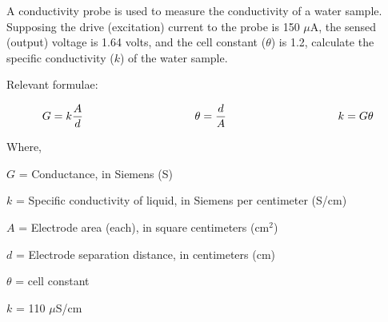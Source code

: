 

A conductivity probe is used to measure the conductivity of a water sample.  Supposing the drive (excitation) current to the probe is 150 $\mu$A, the sensed (output) voltage is 1.64 volts, and the cell constant ($\theta$) is 1.2, calculate the specific conductivity ($k$) of the water sample.

\vskip 10pt

Relevant formulae:

$$G = k{A \over d} \hbox{\hskip 100pt} \theta = {d \over A} \hbox{\hskip 100pt} k = G \theta$$

\noindent
Where,

$G$ = Conductance, in Siemens (S)

$k$ = Specific conductivity of liquid, in Siemens per centimeter (S/cm)

$A$ = Electrode area (each), in square centimeters (cm$^{2}$)

$d$ = Electrode separation distance, in centimeters (cm)

$\theta$ = cell constant

\vskip 10pt







$k$ = 110 $\mu$S/cm










